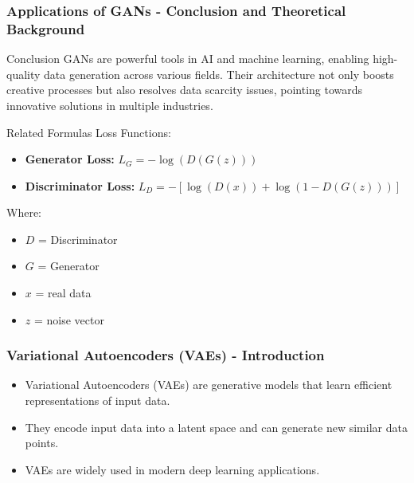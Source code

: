 \documentclass[aspectratio=169]{beamer}
\begin{document}
\begin{frame}[fragile]
    \frametitle{Applications of GANs - Conclusion and Theoretical Background}
    \begin{block}{Conclusion}
        GANs are powerful tools in AI and machine learning, enabling high-quality data generation across various fields. Their architecture not only boosts creative processes but also resolves data scarcity issues, pointing towards innovative solutions in multiple industries.
    \end{block}
    
    \begin{block}{Related Formulas}
        Loss Functions:
        \begin{itemize}
            \item \textbf{Generator Loss:} \( L_G = -\log(D(G(z))) \)
            \item \textbf{Discriminator Loss:} \( L_D = -[\log(D(x)) + \log(1 - D(G(z)))] \)
        \end{itemize}
        Where:
        \begin{itemize}
            \item \( D \) = Discriminator
            \item \( G \) = Generator
            \item \( x \) = real data
            \item \( z \) = noise vector
        \end{itemize}
    \end{block}
\end{frame}

\begin{frame}[fragile]
    \frametitle{Variational Autoencoders (VAEs) - Introduction}
    \begin{itemize}
        \item Variational Autoencoders (VAEs) are generative models that learn efficient representations of input data.
        \item They encode input data into a latent space and can generate new similar data points.
        \item VAEs are widely used in modern deep learning applications.
    \end{itemize}
\end{frame}
\end{document}

